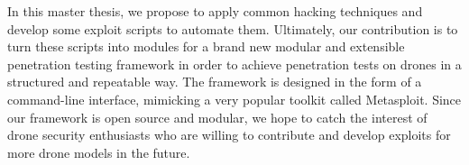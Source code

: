 \begin{center}
\begin{minipage}{15cm}
In this master thesis, we propose to apply common hacking techniques and develop some exploit scripts to automate them. Ultimately, our contribution is to turn these scripts into modules for a brand new modular and extensible penetration testing framework in order to achieve penetration tests on drones in a structured and repeatable way. The framework is designed in the form of a command-line interface, mimicking a very popular toolkit called Metasploit. Since our framework is open source and modular, we hope to catch the interest of drone security enthusiasts who are willing to contribute and develop exploits for more drone models in the future. 
\end{minipage}
\end{center}

\vfill

